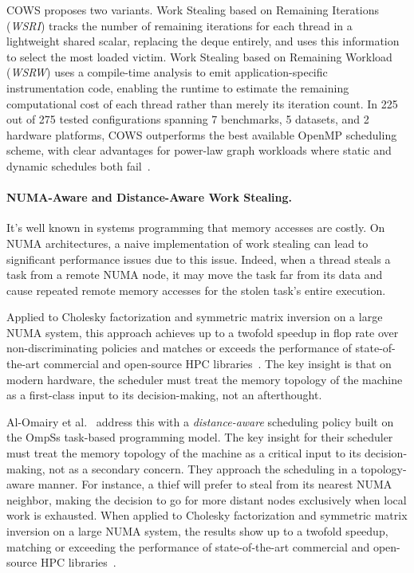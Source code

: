 \documentclass[11pt,english]{article}
\begin{document}
    COWS proposes two variants. Work Stealing based on Remaining Iterations (\emph{WSRI}) tracks the number of remaining iterations for each thread in a lightweight shared scalar, replacing the deque entirely, and uses this information to select the most loaded victim. Work Stealing based on Remaining Workload (\emph{WSRW}) uses a compile-time analysis to emit application-specific instrumentation code, enabling the runtime to estimate the remaining computational cost of each thread rather than merely its iteration count. In 225 out of 275 tested configurations spanning 7 benchmarks, 5 datasets, and 2 hardware platforms, COWS outperforms the best available OpenMP scheduling scheme, with clear advantages for power-law graph workloads where static and dynamic schedules both fail~\cite{mishra2024cows}.

    \paragraph{NUMA-Aware and Distance-Aware Work Stealing.}    
    It's well known in systems programming that memory accesses are costly. On NUMA architectures, a naive implementation of work stealing can lead to significant performance issues due to this issue. Indeed, when a thread steals a task from a remote NUMA node, it may move the task far from its data and cause repeated remote memory accesses for the stolen task's entire execution.

    Applied to Cholesky factorization and symmetric matrix inversion on a large NUMA system, this approach achieves up to a twofold speedup in flop rate over non-discriminating policies and matches or exceeds the performance of state-of-the-art commercial and open-source HPC libraries~\cite{alomairy2015numa}. The key insight is that on modern hardware, the scheduler must treat the memory topology of the machine as a first-class input to its decision-making, not an afterthought.

    Al-Omairy et al.~\cite{alomairy2015numa} address this with a \emph{distance-aware} scheduling policy built on the OmpSs task-based programming model. The key insight for their scheduler must treat the memory topology of the machine as a critical input to its decision-making, not as a secondary concern. They approach the scheduling in a topology-aware manner. For instance, a thief will prefer to steal from its nearest NUMA neighbor, making the decision to go for more distant nodes exclusively when local work is exhausted. When applied to Cholesky factorization and symmetric matrix inversion on a large NUMA system, the results show up to a twofold speedup, matching or exceeding the performance of state-of-the-art commercial and open-source HPC libraries~\cite{alomairy2015numa}.
\end{document}
